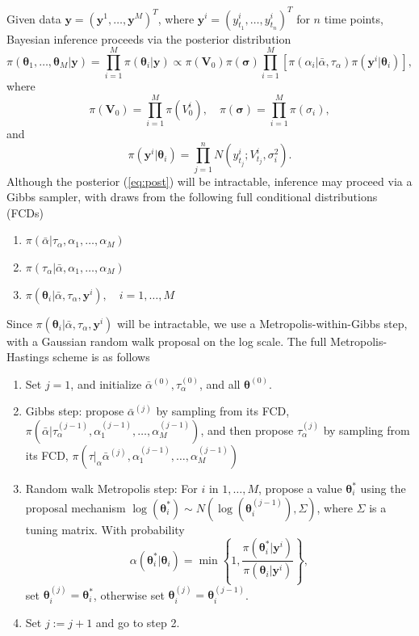 \documentclass[11pt,a4paper]{article}
\begin{document}
Given data $\boldsymbol{y} = (\boldsymbol{y}^1, \ldots, \boldsymbol{y}^M)^T$, where $\boldsymbol{y}^i = (y_{t_1}^i, \ldots, y_{t_n}^i)^T$ for $n$ time points, Bayesian inference proceeds via the posterior distribution
\begin{equation}
\pi(\boldsymbol{\theta}_1, \ldots, \boldsymbol{\theta}_M|\boldsymbol{y}) = \prod_{i=1}^M\pi(\boldsymbol{\theta}_i|\boldsymbol{y}) \propto \pi(\boldsymbol{V}_0) \pi(\boldsymbol{\sigma}) \prod_{i=1}^M \left[ \pi(\alpha_i|\bar{\alpha}, \tau_\alpha) \pi(\boldsymbol{y}^i|\boldsymbol{\theta}_i) \right],
\label{eq:post}
\end{equation}
where
\[
\pi(\boldsymbol{V}_0) = \prod_{i=1}^M\pi(V_0^i), \quad \pi(\boldsymbol{\sigma}) = \prod_{i=1}^M\pi(\sigma_i),
\]
and
\[
\pi(\boldsymbol{y}^i|\boldsymbol{\theta}_i) = \prod_{j=1}^n N(y_{t_j}^i; V_{t_j}^i, \sigma_i^2).
\]
Although the posterior (\ref{eq:post}) will be intractable, inference may proceed via a Gibbs sampler, with draws from the following full conditional distributions (FCDs)
\begin{enumerate}
\item $\pi(\bar{\alpha}|\tau_\alpha, \alpha_1,\ldots,\alpha_M)$

\item $\pi(\tau_\alpha|\bar{\alpha}, \alpha_1,\ldots,\alpha_M)$

\item $\pi(\boldsymbol{\theta}_i| \bar{\alpha}, \tau_\alpha, \boldsymbol{y}^i), \quad i=1, \ldots, M $
\end{enumerate}
Since $\pi(\boldsymbol{\theta}_i| \bar{\alpha}, \tau_\alpha, \boldsymbol{y}^i)$ will be intractable, we use a Metropolis-within-Gibbs step, with a Gaussian random walk proposal on the log scale. The full Metropolis-Hastings scheme is as follows
\begin{enumerate}
\item Set $j=1$, and initialize  $\bar{\alpha}^{(0)}, \tau_\alpha^{(0)}$, and all $\boldsymbol{\theta}^{(0)}$.
\item Gibbs step: propose $\bar{\alpha}^{(j)}$ by sampling from its FCD, $\pi(\bar{\alpha}|\tau_\alpha^{(j-1)},\alpha_1^{(j-1)}, \ldots, \alpha_M^{(j-1)})$, and then propose $\tau_\alpha^{(j)}$ by sampling from its FCD, $\pi(\tau|_\alpha\bar{\alpha}^{(j)},\alpha_1^{(j-1)}, \ldots, \alpha_M^{(j-1)})$

\item Random walk Metropolis step: For $i$ in $1, \ldots, M$, propose a value $\boldsymbol{\theta}_i^*$ using the proposal mechanism $\log(\boldsymbol{\theta}_i^*) \sim N(\log(\boldsymbol{\theta}_i^{(j-1)}),\Sigma)$, where $\Sigma$ is a tuning matrix. With probability
\begin{equation*}
\alpha(\boldsymbol{\theta}_i^*|\boldsymbol{\theta}_i)=\min\left\{1,\frac{\pi(\boldsymbol{\theta}_i^*|\boldsymbol{y}^i)}{\pi(\boldsymbol{\theta}_i|\boldsymbol{y}^i)} \right\},
\end{equation*}
set $\boldsymbol{\theta}_i^{(j)}=\boldsymbol{\theta}_i^*$, otherwise set $\boldsymbol{\theta}_i^{(j)}=\boldsymbol{\theta}_i^{(j-1)}$.
\item Set $j:=j+1$ and go to step 2.
\end{enumerate}
\end{document}
